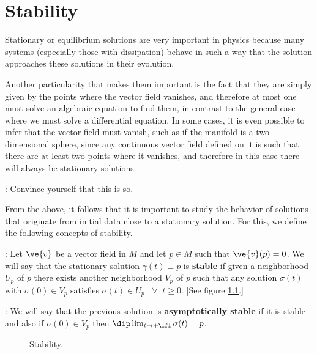 

\chapter{Stability}

Stationary or equilibrium solutions are very important in physics because many systems (especially those with dissipation) behave in such a way that the solution approaches these solutions in their evolution.

Another particularity that makes them important is the fact that they are simply given by the points where the vector field vanishes, and therefore at most one must solve an algebraic equation to find them, in contrast to the general case where we must solve a differential equation. In some cases, it is even possible to infer that the vector field must vanish, such as if the manifold is a two-dimensional sphere, since any continuous vector field defined on it is such that there are at least two points where it vanishes, and therefore in this case there will always be stationary solutions.

\espa
\ejer: Convince yourself that this is so.
\espa

From the above, it follows that it is important to study the behavior of solutions that originate from initial data close to a stationary solution. For this, we define the following concepts of stability.

: 
Let $\ve{v}$ be a vector field in $M$ and let $p \in M$ such that $\ve{v}(p) = 0$. We will say that the stationary solution $\gamma (t)\equiv p$ is {\bf stable} if given a neighborhood $U_p$ of $p$ there exists another neighborhood $V_p$ of $p$ such that any solution $\sigma(t)$ with $\sigma(0) \in V_p$ satisfies $\sigma(t) \in U_p \;\;\;\forall\;\; t \geq 0$. [See figure \ref{fig:6_1}.]

: 
We will say that the previous solution is {\bf asymptotically stable} if it is stable and also if $\sigma (0) \in V_p$ then $\dip\lim_{t\to+\ifi} \sigma(t)=p$. 

\espa 
\begin{figure}[htbp]
  \begin{center}
    \caption{Stability.}
    \label{fig:6_1}
  \end{center}
\end{figure}

